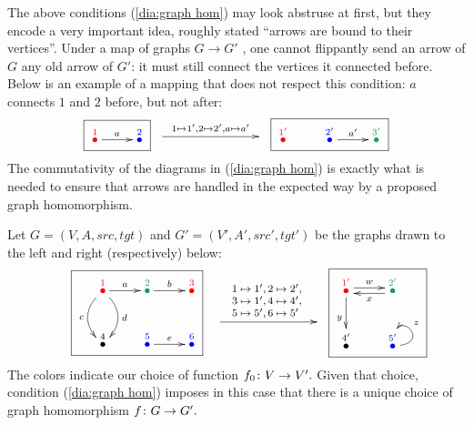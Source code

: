 \documentclass[../main/CT4S-EN-RU]{subfiles}
\begin{document}
\begin{definitionRUS}\label{def:graph homomorphism}
\end{definitionRUS}

\begin{remarkENG}
The above conditions (\ref{dia:graph hom}) may look abstruse at first, but they encode a very important idea, roughly stated “arrows are bound to their vertices”. Under a map of graphs $G\to G'$ , one cannot flippantly send an arrow of $G$ any old arrow of $G'$: it must still connect the vertices it connected before. Below is an example of a mapping that does not respect this condition: $a$ connects $1$ and $2$ before, but not after:
$$
\fbox{\xymatrix{\LMO{\color{red}{1}}\ar[r]^{a}&\LMO{\color{blue}{2}}}}
\xymatrix{~\ar[rr]^{1\mapsto 1',2\mapsto 2', a\mapsto a'}&\hsp&~}
\fbox{\xymatrix{\LMO{\color{red}{1'}}&\LMO{\color{blue}{2'}}\ar[r]^{a'}&\LMO{\color{ForestGreen}{3'}}}}
$$
The commutativity of the diagrams in (\ref{dia:graph hom}) is exactly what is needed to ensure that arrows are handled in the expected way by a proposed graph homomorphism.
\end{remarkENG}

\begin{remarkRUS}
\end{remarkRUS}

\begin{exampleENG}\label{ex:graph hom}
Let $G=(V,A,src,tgt)$ and $G'=(V',A',src',tgt')$ be the graphs drawn to the left and right (respectively) below:
\begin{align}\label{dia:graph hom example}
\parbox{1.5in}{\fbox{\xymatrix{\LMO{\color{red}{1}}\ar[r]^a\ar@/^1pc/[d]^d\ar@/_1pc/[d]_c&\LMO{\color{ForestGreen}{2}}\ar[r]^b&\LMO{\color{red}{3}}\\\LMO{4}&\LMO{\color{blue}{5}}\ar[r]^e&\LMO{\color{blue}{6}}}}}
\parbox{1in}{\xymatrix{~\ar[rr]^{\parbox{.8in}{\vspace{-.2in}\footnotesize$1\mapsto 1', 2\mapsto 2',\\ 3\mapsto 1',4\mapsto 4',\\ 5\mapsto 5',6\mapsto5'$}}&\hsp&~}}
\parbox{.8in}{\fbox{\xymatrix{\LMO{\color{red}{1'}}\ar@<.5ex>[r]^w\ar[d]_y&\LMO{\color{ForestGreen}{2'}}\ar@<.5ex>[l]^x\\\LMO{4'}&\LMO{\color{blue}{5'}}\ar@(r,u)[]_z}}}
\end{align}
The colors indicate our choice of function $f_0\colon V\rightarrow V'.$ Given that choice, condition (\ref{dia:graph hom}) imposes in this case that there is a unique choice of graph homomorphism $f\colon G\rightarrow G'.$ 
\end{exampleENG}
\end{document}
